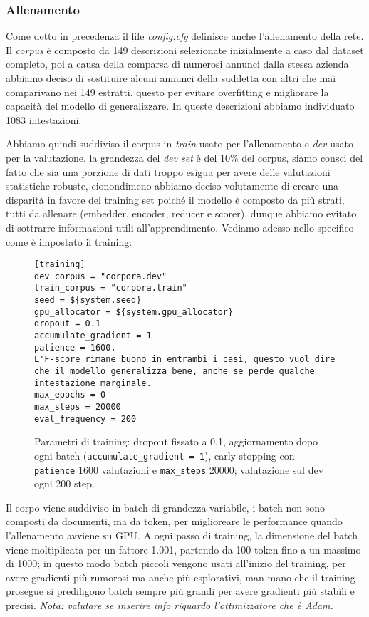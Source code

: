 \subsubsection{Allenamento}

\noindent Come detto in precedenza il file \textit{config.cfg} definisce anche l'allenamento della rete. Il \textit{corpus} è composto da 149 descrizioni selezionate inizialmente a caso dal dataset completo, poi a causa della comparsa di numerosi annunci dalla stessa azienda abbiamo deciso di sostituire alcuni annunci della suddetta con altri che mai comparivano nei 149 estratti, questo per evitare overfitting e migliorare la capacità del modello di generalizzare. In queste descrizioni abbiamo individuato 1083 intestazioni.

\noindent Abbiamo quindi suddiviso il corpus in \textit{train} usato per l'allenamento e \textit{dev} usato per la valutazione. la grandezza del \textit{dev set} è del 10\% del corpus, siamo consci del fatto che sia una porzione di dati troppo esigua per avere delle valutazioni statistiche robuste, cionondimeno abbiamo deciso volutamente di creare una disparità in favore del training set poiché il modello è composto da più strati, tutti da allenare (embedder, encoder, reducer e scorer), dunque abbiamo evitato di sottrarre informazioni utili all'apprendimento. Vediamo adesso nello specifico come è impostato il training:

\begin{figure}[H]
    \centering
    \scriptsize
\begin{lstlisting}[style=cmd]
[training]
dev_corpus = "corpora.dev"
train_corpus = "corpora.train"
seed = ${system.seed}
gpu_allocator = ${system.gpu_allocator}
dropout = 0.1
accumulate_gradient = 1
patience = 1600.
L'F-score rimane buono in entrambi i casi, questo vuol dire che il modello generalizza bene, anche se perde qualche intestazione marginale.
max_epochs = 0
max_steps = 20000
eval_frequency = 200
\end{lstlisting}
    \caption{Parametri di training: dropout fissato a 0.1, aggiornamento dopo ogni batch (\texttt{accumulate\_gradient = 1}), early stopping con \texttt{patience} 1600 valutazioni e \texttt{max\_steps} 20000; valutazione sul dev ogni 200 step.}
    \label{fig:cfg-training}
\end{figure}

\noindent Il corpo viene suddiviso in batch di grandezza variabile, i batch non sono composti da documenti, ma da token, per miglioreare le performance quando l'allenamento avviene su GPU. A ogni passo di training, la dimensione del batch viene moltiplicata per un fattore 1.001, partendo da 100 token fino a un massimo di 1000; in questo modo batch piccoli vengono usati all'inizio del training, per avere gradienti più rumorosi ma anche più esplorativi, man mano che il training prosegue si prediligono batch sempre più grandi per avere gradienti più stabili e precisi. \textit{Nota: valutare se inserire info riguardo l'ottimizzatore che è Adam.}

